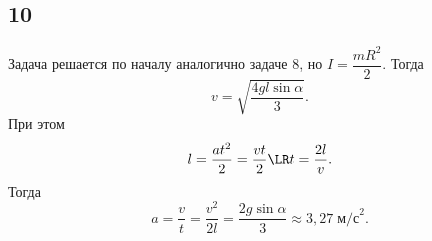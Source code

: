 \subsection{10}

Задача решается по началу аналогично задаче 8, но $I=\dfrac{mR^2}{2}$. Тогда
\[
v=\sqrt{\frac{4gl\sin\alpha}{3}}.
\]
При этом
\[
l=\frac{at^2}{2}=\frac{vt}{2}\LR t=\frac{2l}{v}.
\]
Тогда
\[
a=\frac{v}{t}=\frac{v^2}{2l}=\frac{2g\sin\alpha}{3}\approx3{,}27\;\text{м/с}^2.
\]